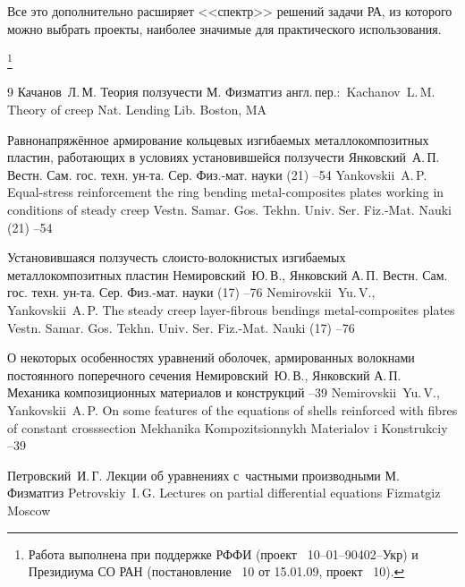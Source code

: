 Все это дополнительно расширяет <<спектр>> решений задачи РА, из которого можно выбрать проекты, наиболее значимые для практического использования.

\thanks{Работа выполнена при поддержке РФФИ (проект \No~10--01--90402--Укр)
и Президиума СО РАН (постановление \No~10 от 15.01.09, проект \No~10).}




\begin{thebibliography}{9}
\by Качанов~Л.\,М.
\book Теория ползучести
\publaddr М.
\publ Физматгиз
\transl \mbox{\!англ.\,пер.:\,}
\by Kachanov~L.\,M.
\book Theory of creep
\publ Nat. Lending Lib.
\publaddr Boston, MA 

\paper Равнонапряжённое армирование кольцевых изгибаемых металлокомпозитных пластин, работающих в условиях установившейся ползучести
\by Янковский~А.\,П.
\jour Вестн. Сам. гос. техн. ун-та. Сер. Физ.-мат. науки
(21)
--54
\misctransl
\by Yankovskii~A.\,P.
\paper Equal-stress reinforcement the ring bending metal-composites plates working in conditions of steady creep
\jour Vestn. Samar. Gos. Tekhn. Univ. Ser. Fiz.-Mat. Nauki
(21)
--54


\paper Установившаяся ползучесть слоисто-волокнистых изгибаемых металлокомпозитных пластин 
\by Немировский~Ю.\,В., Янковский А.\,П.
\jour Вестн. Сам. гос. техн. ун-та. Сер. Физ.-мат. науки
(17)
--76
\misctransl
\by Nemirovskii~Yu.\,V., Yankovskii~A.\,P.
\paper The steady creep layer-fibrous bendings metal-composites plates
\jour Vestn. Samar. Gos. Tekhn. Univ. Ser. Fiz.-Mat. Nauki
(17)
--76


\paper О некоторых особенностях уравнений оболочек, армированных волокнами постоянного поперечного сечения
\by Немировский~Ю.\,В., Янковский А.\,П.
\jour Механика композиционных материалов и конструкций
--39
\misctransl 
\by Nemirovskii~Yu.\,V., Yankovskii~A.\,P.
\paper On some features of the equations of shells reinforced with fibres of constant crosssection
\jour Mekhanika Kompozitsionnykh Materialov i Konstrukciy
--39

\by Петровский~И.\,Г.
\book Лекции об уравнениях с~частными производными
\publaddr М.
\publ Физматгиз
\misctransl
\by Petrovskiy~I.\,G.
\book Lectures on partial differential equations
\publ Fizmatgiz
\publaddr Moscow 


\end{thebibliography}
